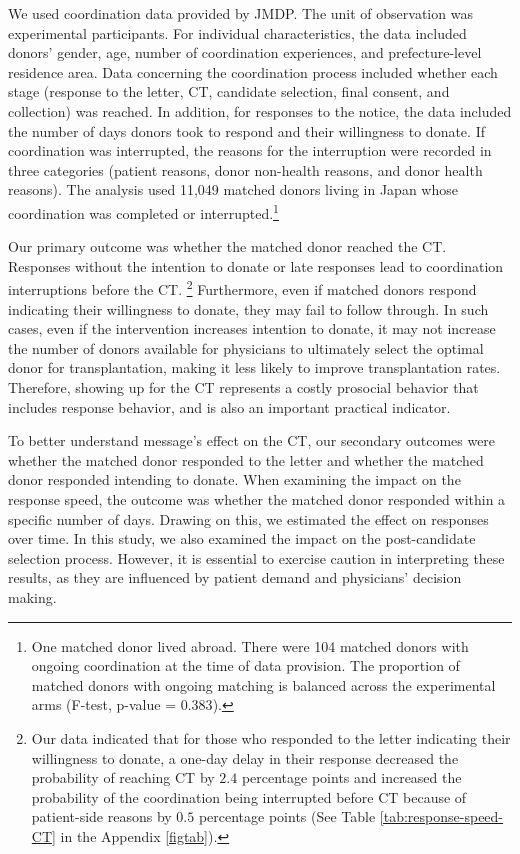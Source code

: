\documentclass[12pt, a4paper]{article}
\begin{document}
We used coordination data provided by JMDP. The unit of observation was experimental participants. For individual characteristics, the data included donors' gender, age, number of coordination experiences, and prefecture-level residence area. Data concerning the coordination process included whether each stage (response to the letter, CT, candidate selection, final consent, and collection) was reached. In addition, for responses to the notice, the data included the number of days donors took to respond and their willingness to donate. If coordination was interrupted, the reasons for the interruption were recorded in three categories (patient reasons, donor non-health reasons, and donor health reasons). The analysis used 11,049 matched donors living in Japan whose coordination was completed or interrupted.\footnote{One matched donor lived abroad. There were 104 matched donors with ongoing coordination at the time of data provision. The proportion of matched donors with ongoing matching is balanced across the experimental arms (F-test, p-value = \(0.383\)).}

Our primary outcome was whether the matched donor reached the CT. Responses without the intention to donate or late responses lead to coordination interruptions before the CT. \footnote{Our data indicated that for those who responded to the letter indicating their willingness to donate, a one-day delay in their response decreased the probability of reaching CT by \(2.4\) percentage points and increased the probability of the coordination being interrupted before CT because of patient-side reasons by \(0.5\) percentage points (See Table \ref{tab:response-speed-CT} in the Appendix \ref{figtab}).} Furthermore, even if matched donors respond indicating their willingness to donate, they may fail to follow through. In such cases, even if the intervention increases intention to donate, it may not increase the number of donors available for physicians to ultimately select the optimal donor for transplantation, making it less likely to improve transplantation rates. Therefore, showing up for the CT represents a costly prosocial behavior that includes response behavior, and is also an important practical indicator.

To better understand message's effect on the CT, our secondary outcomes were whether the matched donor responded to the letter and whether the matched donor responded intending to donate. When examining the impact on the response speed, the outcome was whether the matched donor responded within a specific number of days. Drawing on this, we estimated the effect on responses over time. In this study, we also examined the impact on the post-candidate selection process. However, it is essential to exercise caution in interpreting these results, as they are influenced by patient demand and physicians' decision making.
\end{document}
